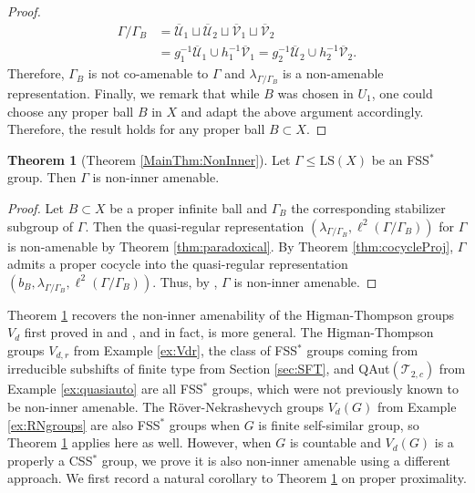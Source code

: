 \documentclass[12pt]{amsart}
\numberwithin{equation}{subsection}
\theoremstyle{definition}
\newtheorem{theorem}{Theorem}[section]
\theoremstyle{definition}
\theoremstyle{remark}
\begin{document}
\begin{proof}
\begin{align*}
    \Gamma/\Gamma_B &= \overline{\mathcal U}_1 \sqcup  \overline{\mathcal U}_2  \sqcup \overline{\mathcal V}_1 \sqcup  \overline{\mathcal V}_2\\
    &=  g^{-1}_1\overline{\mathcal U}_1\cup h^{-1}_1\overline{\mathcal V}_1 = g^{-1}_2\overline{\mathcal U}_2\cup h^{-1}_2\overline{\mathcal V}_2. 
\end{align*}
Therefore, $\Gamma_B$ is not co-amenable to $\Gamma$ and $\lambda_{\Gamma / \Gamma_B}$ is a non-amenable representation. Finally, we remark that while $B$ was chosen in $U_1$, one could choose any proper ball $B$ in $X$ and adapt the above argument accordingly. Therefore, the result holds for any proper ball $B \subset X$.  
\end{proof}




\begin{theorem}[Theorem \ref{MainThm:NonInner}]\label{thm:noninneramen}
    Let $\Gamma \leq \text{LS}(X)$ be an FSS$^*$ group. Then $\Gamma$ is non-inner amenable.
\end{theorem}

\begin{proof}
Let $B \subset X$ be a proper infinite ball and $\Gamma_B$ the corresponding stabilizer subgroup of $\Gamma$. Then the quasi-regular representation $(\lambda_{\Gamma / \Gamma_B},\ell^2 (\Gamma / \Gamma_B))$ for $\Gamma$ is non-amenable by Theorem \ref{thm:paradoxical}. By Theorem \ref{thm:cocycleProj}, $\Gamma$ admits a proper cocycle into the quasi-regular representation $(b_B,\lambda_{\Gamma / \Gamma_B},\ell^2 (\Gamma / \Gamma_B))$. Thus, by \cite[Proposition 2.1]{ozawapopa2010cartanII}, $\Gamma$ is non-inner amenable.

\end{proof}



Theorem \ref{thm:noninneramen} recovers the non-inner amenability of the Higman-Thompson groups $V_d$ first proved in \cite{HO2016} and \cite{bashwinger2022non}, and in fact, is more general. The Higman-Thompson groups $V_{d,r}$ from Example \ref{ex:Vdr}, the class of FSS$^*$ groups coming from irreducible subshifts of finite type from Section \ref{sec:SFT}, and QAut$(\mathcal T_{2,c})$ from Example \ref{ex:quasiauto} are all FSS$^*$ groups, which were not previously known to be non-inner amenable. The R\"{o}ver-Nekrashevych groups $V_d(G)$ from Example \ref{ex:RNgroups} are also FSS$^*$ groups when $G$ is finite self-similar group, so Theorem \ref{thm:noninneramen} applies here as well. However, when $G$ is countable and $V_d(G)$ is a properly a CSS$^*$ group, we prove it is also non-inner amenable using a different approach. We first record a natural corollary to Theorem \ref{thm:noninneramen} on proper proximality. 
\end{document}
